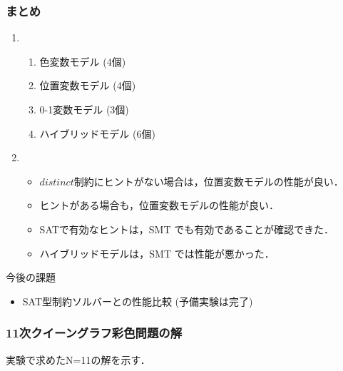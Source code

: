 \documentclass [dvipdfmx,11pt]{beamer}
\newcommand{\distinct}{$distinct$}
\begin{document}
\begin{frame}\frametitle{まとめ}
  \begin{enumerate}
  \item {}
    \begin{enumerate}
      \item 色変数モデル (4個)%
      \item 位置変数モデル (4個)%
      \item 0-1変数モデル (3個)%
      \item ハイブリッドモデル (6個)%
    \end{enumerate}
  \item {}
    \begin{itemize}
    \item {\distinct}制約にヒントがない場合は，位置変数モデルの性能が良い．
    \item ヒントがある場合も，位置変数モデルの性能が良い．
    \item SATで有効なヒントは，SMT でも有効であることが確認できた．
    \item ハイブリッドモデルは，SMT では性能が悪かった．
  \end{itemize}
  \end{enumerate}
  
  \begin{alertblock}{今後の課題}
    \begin{itemize}
    \item SAT型制約ソルバーとの性能比較 (予備実験は完了)
    \end{itemize}
  \end{alertblock}

\end{frame}

\begin{frame}
    \frametitle{11次クイーングラフ彩色問題の解}
    実験で求めたN=11の解を示す．
    
\end{frame}




\end{document}
